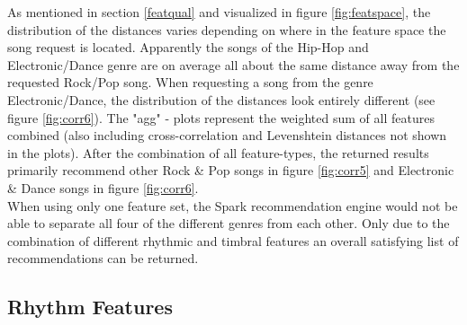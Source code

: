 \noindent As mentioned in section \ref{featqual} and visualized in figure \ref{fig:featspace}, the distribution of the distances varies depending on where in the feature space the song request is located. Apparently the songs of the Hip-Hop and Electronic/Dance genre are on average all about the same distance away from the requested Rock/Pop song. When requesting a song from the genre Electronic/Dance, the distribution of the distances look entirely different (see figure \ref{fig:corr6}).
\noindent The "agg" - plots represent the weighted sum of all features combined (also including cross-correlation and Levenshtein distances not shown in the plots). After the combination of all feature-types, the returned results primarily recommend other Rock \& Pop songs in figure \ref{fig:corr5} and Electronic \& Dance songs in figure \ref{fig:corr6}.\\
When using only one feature set, the Spark recommendation engine would not be able to separate all four of the different genres from each other. Only due to the combination of different rhythmic and timbral features an overall satisfying list of recommendations can be returned.\\

\subsection{Rhythm Features}\label{rhythmrec}

